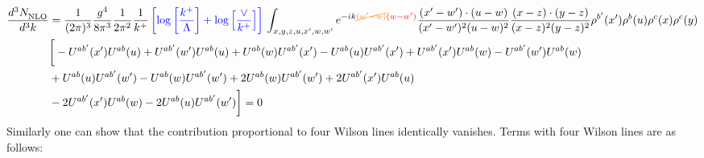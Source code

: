 \documentclass[aps,prd,amsmath,amssymb,nofootinbib]{revtex4-2}
\numberwithin{equation}{section}
\begin{document}
\begin{align}
    \frac{d^{3}N_{\rm NLO}^{\rm}}{d^{3}k}  & = \frac{1}{(2\pi)^{3}}\frac{g^{4}}{8\pi^{3}}\frac{1}{2\pi^{2}} \frac{1}{k^{+}}\,{\color{blue}\left[\log{\left[\frac{k^{+}}{\Lambda}\right]}+\log{\left[\frac{\vee}{k^{+}}\right]}\right]}\,\int_{x,y,z,u,x^{\prime},w,w^{\prime}}e^{-ik{\color{orange}\cancel{(w^{\prime}-w)}}{\color{red}(w-w^{\prime})}}\frac{(x^{\prime}-w^{\prime})\cdot (u-w)}{(x^{\prime}-w^{\prime})^{2} (u-w)^{2}} \frac{(x-z)\cdot (y-z)}{(x-z)^{2}(y-z)^{2}}\rho^{b^{\prime}}(x^{\prime})\rho^{b}(u)\rho^{c}(x)\rho^{c}(y)\notag \\ & \bigg[-U^{ab^{\prime}}(x^{\prime})U^{ab}(u) +U^{ab^{\prime}}(w^{\prime})U^{ab}(u) + U^{ab}(w)U^{ab^{\prime}}(x^{\prime}) - U^{ab}(u)U^{ab^{\prime}}(x^{\prime}) + U^{ab^{\prime}}(x^{\prime})U^{ab}(w) - U^{ab^{\prime}}(w^{\prime})U^{ab}(w) \notag \\ & + U^{ab}(u)U^{ab^{\prime}}(w^{\prime})  - U^{ab}(w)U^{ab^{\prime}}(w^{\prime})+2U^{ab}(w)U^{ab^{\prime}}(w^{\prime}) + 2 U^{ab^{\prime}}(x^{\prime})U^{ab}(u) \notag \\ & -2 U^{ab^{\prime}}(x^{\prime})U^{ab}(w) - 2U^{ab}(u)U^{ab^{\prime}}(w^{\prime})\bigg] = 0 
\end{align}
Similarly one can show that the contribution proportional to four Wilson lines identically vanishes. Terms with four Wilson lines are as follows:
\end{document}
